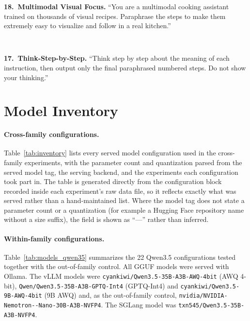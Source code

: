\documentclass[11pt]{article}
\begin{document}
{\begin{description}[style=unboxed,leftmargin=0pt,itemsep=4pt]
\textbf{18.\ Multimodal Visual Focus.} ``You are a multimodal cooking assistant trained on thousands of visual recipes. Paraphrase the steps to make them extremely easy to visualize and follow in a real kitchen.''

\item[\textbf{Thinking}] ~

\textbf{17.\ Think-Step-by-Step.} ``Think step by step about the meaning of each instruction, then output only the final paraphrased numbered steps. Do not show your thinking.''

\end{description}
}


\section{Model Inventory}
\label{app:models}

\paragraph{Cross-family configurations.}
Table~\ref{tab:inventory} lists every served model configuration used in the
cross-family experiments, with the parameter count and quantization parsed from
the served model tag, the serving backend, and the experiments each
configuration took part in. The table is generated directly from the
configuration block recorded inside each experiment's raw data file, so it
reflects exactly what was served rather than a hand-maintained list. Where the
model tag does not state a parameter count or a quantization (for example a
Hugging Face repository name without a size suffix), the field is shown as
``---'' rather than inferred.



\paragraph{Within-family configurations.}
Table~\ref{tab:models_qwen35} summarizes the 22 Qwen3.5 configurations tested
together with the out-of-family control. All GGUF models were served with
Ollama. The vLLM models were
\texttt{cyankiwi/\allowbreak Qwen3.5-35B-A3B-AWQ-4bit} (AWQ 4-bit),
\texttt{Qwen/\allowbreak Qwen3.5-35B-A3B-GPTQ-Int4} (GPTQ-Int4) and
\texttt{cyankiwi/\allowbreak Qwen3.5-9B-AWQ-4bit} (9B AWQ) and, as the out-of-family
control,
\texttt{nvidia/\allowbreak NVIDIA-\allowbreak Nemotron--Nano-\allowbreak 30B-A3B-\allowbreak NVFP4}.
The SGLang model was \texttt{txn545/\allowbreak Qwen3.5-35B-A3B-NVFP4}.
\end{document}
